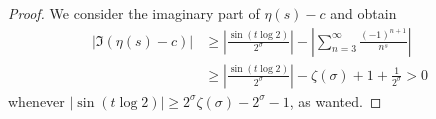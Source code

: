 \documentclass[10pt,a4paper]{amsart}
\begin{document}
\begin{proof}
    We consider the imaginary part of $\eta(s)-c$ and obtain
    \begin{align*}
        |\Im(\eta(s)-c)|&\geq \left|\frac{\sin(t\log 2)}{2^\sigma} \right|-
        \left|\sum_{n=3}^\infty \frac{(-1)^{n+1}}{n^s}\right|\\
        &\geq \left|\frac{\sin(t\log 2)}{2^\sigma} \right|-\zeta(\sigma)+1+\frac{1}{2^\sigma} 
             > 0
    \end{align*}
   whenever $|\sin(t\log 2)|\geq 2^\sigma \zeta(\sigma) -2^\sigma-1$, as wanted.
\end{proof}
\end{document}
